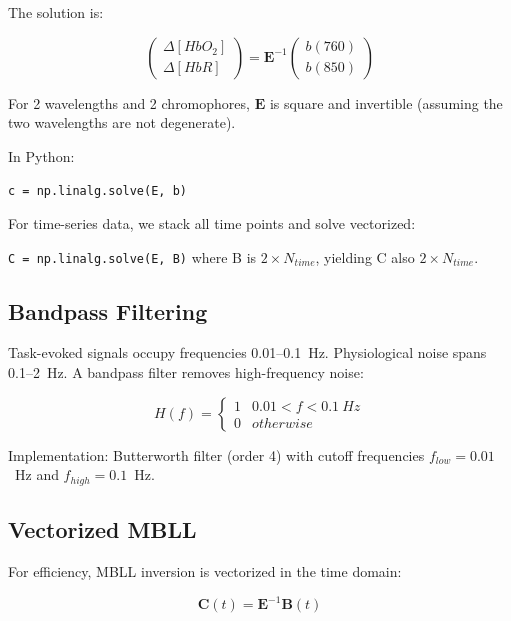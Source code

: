 \documentclass[12pt]{article}
\def\text#1{#1}%
\begin{document}
The solution is:

\begin{equation}
\begin{pmatrix} \Delta[\text{HbO}_2] \\ \Delta[\text{HbR}] \end{pmatrix} = \mathbf{E}^{-1} \begin{pmatrix} b(760) \\ b(850) \end{pmatrix}
\end{equation}

For 2 wavelengths and 2 chromophores, $\mathbf{E}$ is square and invertible (assuming the two wavelengths are not degenerate).

In Python:

\texttt{c = np.linalg.solve(E, b)}

For time-series data, we stack all time points and solve vectorized:

\texttt{C = np.linalg.solve(E, B)} where B is $2 \times N_{\text{time}}$, yielding C also $2 \times N_{\text{time}}$.

\subsection{Bandpass Filtering}

Task-evoked signals occupy frequencies 0.01--0.1~Hz. Physiological noise spans 0.1--2~Hz. A bandpass filter removes high-frequency noise:

\begin{equation}
H(f) = \begin{cases} 1 & 0.01 < f < 0.1~\text{Hz} \\ 0 & \text{otherwise} \end{cases}
\end{equation}

Implementation: Butterworth filter (order 4) with cutoff frequencies $f_{\text{low}} = 0.01$~Hz and $f_{\text{high}} = 0.1$~Hz.

\subsection{Vectorized MBLL}

For efficiency, MBLL inversion is vectorized in the time domain:

\begin{equation}
\mathbf{C}(t) = \mathbf{E}^{-1} \mathbf{B}(t)
\end{equation}
\end{document}
